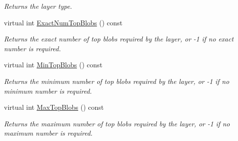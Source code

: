 \begin{DoxyCompactItemize}
\begin{DoxyCompactList}\small\item\em Returns the layer type. \end{DoxyCompactList}\item 
virtual int \mbox{\hyperlink{classcaffe_1_1_softmax_with_loss_layer_a9035d000b2ce51a973f255a5eb2df8e3}{Exact\+Num\+Top\+Blobs}} () const
\begin{DoxyCompactList}\small\item\em Returns the exact number of top blobs required by the layer, or -\/1 if no exact number is required. \end{DoxyCompactList}\item 
virtual int \mbox{\hyperlink{classcaffe_1_1_softmax_with_loss_layer_a9969336702fb1bbf31750629fb38fb45}{Min\+Top\+Blobs}} () const
\begin{DoxyCompactList}\small\item\em Returns the minimum number of top blobs required by the layer, or -\/1 if no minimum number is required. \end{DoxyCompactList}\item 
virtual int \mbox{\hyperlink{classcaffe_1_1_softmax_with_loss_layer_a5a0b4c02fe76ae9087cd8b1b9edd9910}{Max\+Top\+Blobs}} () const
\begin{DoxyCompactList}\small\item\em Returns the maximum number of top blobs required by the layer, or -\/1 if no maximum number is required. \end{DoxyCompactList}\end{DoxyCompactItemize}
